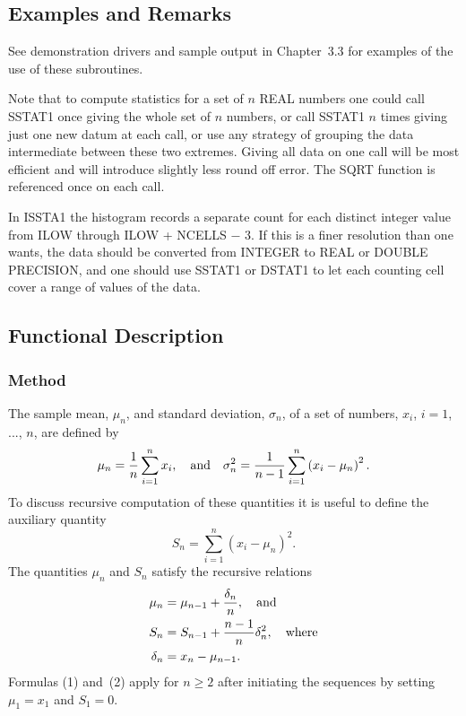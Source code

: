 \documentclass[twoside]{MATH77}
\begin{document}
\subsection{Examples and Remarks}

See demonstration drivers and sample output in Chapter~3.3 for examples of
the use of these subroutines.

Note that to compute statistics for a set of $n$ REAL numbers one could call
SSTAT1 once giving the whole set of $n$ numbers, or call SSTAT1 $n$ times
giving just one new datum at each call, or use any strategy of grouping
the data intermediate between these two extremes. Giving all data on one
call will be most efficient and will introduce slightly less round off
error. The SQRT function is referenced once on each call.

In ISSTA1 the histogram records a separate count for each distinct integer
value from ILOW through ILOW + NCELLS $-$ 3. If this is a finer resolution
than one wants, the data should be converted from INTEGER to REAL or DOUBLE
PRECISION, and one should use SSTAT1 or DSTAT1 to let each counting cell
cover a range of values of the data.

\subsection{Functional Description}

\subsubsection{Method}

The sample mean, $\mu _n$, and standard deviation, $\sigma _n$, of a set of
numbers, $x_i$, $i=1$, ..., $n$, are defined by%
\begin{equation*}
\mu _n=\frac 1n\sum_{i=1}^nx_i,\quad \text{and\quad }\sigma _n^2=\frac
1{n-1}\sum_{i=1}^n\left( x_i-\mu _n\right) ^2.
\end{equation*}
To discuss recursive computation of these quantities it is useful to define
the auxiliary quantity%
\begin{equation*}
S_n=\sum_{i=1}^n\left( x_i-\mu _n\right) ^2.
\end{equation*}
The quantities $\mu _n$ and $S_n$ satisfy the recursive relations
\begin{align}
\label{O1}\mu _n&=\mu _{n-1}+\frac{\delta _n}n,\quad \text{and}\\
\label{O2}S_n&=S_{n-1}+\frac{n-1}n\delta _n^2,\quad \text{where}\\
\delta _n&=x_n-\mu _{n-1}.\notag
\end{align}
Formulas (1) and~(2) apply for $n\geq 2$ after initiating the sequences by setting
$\mu _1=x_1$ and $S_1=0.$
\end{document}

